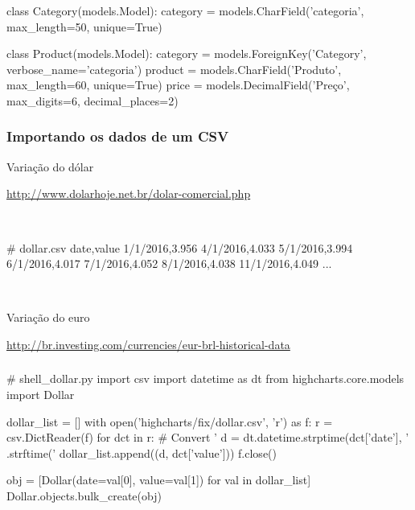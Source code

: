 \documentclass[aspectratio=169]{beamer}
\begin{document}
{\begin{frame}[fragile]
\begin{pythoncode}
class Category(models.Model):
    category = models.CharField('categoria', max_length=50,
                                unique=True)


class Product(models.Model):
    category = models.ForeignKey('Category',
                                 verbose_name='categoria')
    product = models.CharField('Produto', max_length=60,
                               unique=True)
    price = models.DecimalField('Preço', max_digits=6,
                                decimal_places=2)
\end{pythoncode}

\end{frame}

\begin{frame}[fragile]\frametitle{Importando os dados de um CSV}

Variação do dólar

\url{http://www.dolarhoje.net.br/dolar-comercial.php}

\

\begin{pythoncode}
# dollar.csv
date,value
1/1/2016,3.956
4/1/2016,4.033
5/1/2016,3.994
6/1/2016,4.017
7/1/2016,4.052
8/1/2016,4.038
11/1/2016,4.049
...
\end{pythoncode}

\

Variação do euro

\url{http://br.investing.com/currencies/eur-brl-historical-data}

\end{frame}

\begin{frame}[fragile]\frametitle{}

\begin{pythoncode}
# shell_dollar.py
import csv
import datetime as dt
from highcharts.core.models import Dollar

dollar_list = []
with open('highcharts/fix/dollar.csv', 'r') as f:
    r = csv.DictReader(f)
    for dct in r:
        # Convert '%
        d = dt.datetime.strptime(dct['date'], '%
                       .strftime('%
        dollar_list.append((d, dct['value']))
    f.close()

obj = [Dollar(date=val[0], value=val[1]) for val in dollar_list]
Dollar.objects.bulk_create(obj)
\end{pythoncode}

\end{frame}

}
\end{document}
